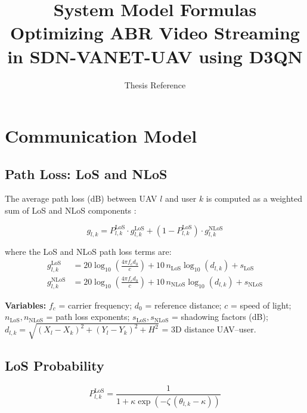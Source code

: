 \documentclass[11pt,a4paper]{article}
\title{System Model Formulas\\
\large Optimizing ABR Video Streaming in SDN-VANET-UAV using D3QN}
\author{Thesis Reference}
\date{}
\begin{document}
\maketitle
\tableofcontents
\newpage

\section{Communication Model}

\subsection{Path Loss: LoS and NLoS}

The average path loss (dB) between UAV $l$ and user $k$ is computed as a
weighted sum of LoS and NLoS components \cite{Xie}:

\begin{equation}
  g_{l,k} = P_{l,k}^{\mathrm{LoS}} \cdot g_{l,k}^{\mathrm{LoS}}
           + \left(1 - P_{l,k}^{\mathrm{LoS}}\right) \cdot g_{l,k}^{\mathrm{NLoS}}
  \tag{Xie~1--2}
\end{equation}

\noindent where the LoS and NLoS path loss terms are:
\begin{align}
  g_{l,k}^{\mathrm{LoS}}  &= 20\log_{10}\!\left(\tfrac{4\pi f_c d_0}{c}\right)
                              + 10\,n_{\mathrm{LoS}}\log_{10}(d_{l,k}) + s_{\mathrm{LoS}}
  \tag{Xie~1} \\
  g_{l,k}^{\mathrm{NLoS}} &= 20\log_{10}\!\left(\tfrac{4\pi f_c d_0}{c}\right)
                              + 10\,n_{\mathrm{NLoS}}\log_{10}(d_{l,k}) + s_{\mathrm{NLoS}}
  \tag{Xie~2}
\end{align}

\noindent \textbf{Variables:}
$f_c$ = carrier frequency;
$d_0$ = reference distance;
$c$ = speed of light;
$n_{\mathrm{LoS}}, n_{\mathrm{NLoS}}$ = path loss exponents;
$s_{\mathrm{LoS}}, s_{\mathrm{NLoS}}$ = shadowing factors (dB);
$d_{l,k} = \sqrt{(X_l-X_k)^2+(Y_l-Y_k)^2+H^2}$ = 3D distance UAV--user.

\subsection{LoS Probability}

\begin{equation}
  P_{l,k}^{\mathrm{LoS}} = \frac{1}{1 + \kappa \exp\!\left(-\zeta\,(\theta_{l,k} - \kappa)\right)}
  \tag{Xie~3}
\end{equation}
\end{document}
